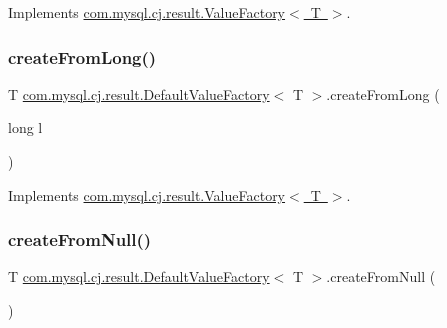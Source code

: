 Implements \mbox{\hyperlink{interfacecom_1_1mysql_1_1cj_1_1result_1_1_value_factory_a9977e0c9d2bb9e306ee4a5a2ead6840c}{com.\+mysql.\+cj.\+result.\+Value\+Factory$<$ T $>$}}.

\mbox{\label{classcom_1_1mysql_1_1cj_1_1result_1_1_default_value_factory_a051d2bb4762b37e5318c4b12879fee16}} 
\subsubsection{\texorpdfstring{create\+From\+Long()}{createFromLong()}}
{\footnotesize\ttfamily T \mbox{\hyperlink{classcom_1_1mysql_1_1cj_1_1result_1_1_default_value_factory}{com.\+mysql.\+cj.\+result.\+Default\+Value\+Factory}}$<$ T $>$.create\+From\+Long (\begin{DoxyParamCaption}\item[{long}]{l }\end{DoxyParamCaption})}



Implements \mbox{\hyperlink{interfacecom_1_1mysql_1_1cj_1_1result_1_1_value_factory_a48c32868f2e3efac502522211a40f642}{com.\+mysql.\+cj.\+result.\+Value\+Factory$<$ T $>$}}.

\mbox{\label{classcom_1_1mysql_1_1cj_1_1result_1_1_default_value_factory_ad19879592d2d343604ceff8f7d6dde84}} 
\subsubsection{\texorpdfstring{create\+From\+Null()}{createFromNull()}}
{\footnotesize\ttfamily T \mbox{\hyperlink{classcom_1_1mysql_1_1cj_1_1result_1_1_default_value_factory}{com.\+mysql.\+cj.\+result.\+Default\+Value\+Factory}}$<$ T $>$.create\+From\+Null (\begin{DoxyParamCaption}{ }\end{DoxyParamCaption})}



